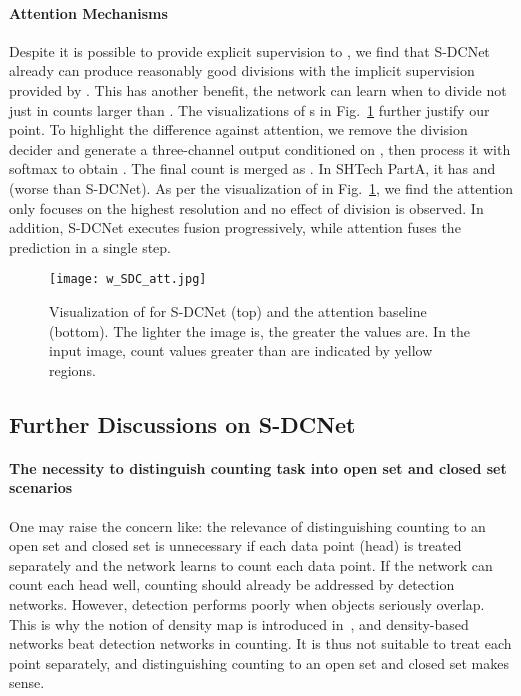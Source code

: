 \documentclass[10pt,twocolumn,letterpaper]{article}
\begin{document}
\paragraph{Attention Mechanisms}
Despite it is possible to provide explicit supervision to , we find that S-DCNet already can produce reasonably good divisions with the implicit supervision provided by . This has another benefit, the network can learn when to divide not just in counts larger than . The visualizations of s in Fig.~\ref{fig:w_visual} further justify our point. To highlight the difference against attention, we remove the division decider and generate a three-channel output conditioned on , then process it with softmax to obtain . The final count is merged as . In SHTech PartA, it has   and   (worse than S-DCNet). As per the visualization of  in Fig.~\ref{fig:w_visual}, we find the attention only focuses on the highest resolution and no effect of division is observed. In addition, S-DCNet executes fusion progressively, while attention fuses the prediction in a single step.

\begin{figure}[!ht]
	\begin{center}
\texttt{[image: w\_SDC\_att.jpg]}
	\end{center}
	\vspace{-15pt}
	\caption{Visualization of  for S-DCNet (top) and the attention baseline (bottom). The lighter the image is, the greater the values are. In the input image, count values greater than  are indicated by yellow regions.}
	\label{fig:w_visual}
	\vspace{-15pt}
\end{figure}


\subsection{Further Discussions on S-DCNet}
\paragraph{The necessity to distinguish counting task into open set and closed set scenarios}
One may raise the concern like: the relevance of distinguishing counting to an open set and closed set is unnecessary if each data point (head) is treated separately and the network learns to count each data point. If the network can count each head well, counting should already be addressed by detection networks. However, detection performs poorly when objects seriously overlap. This is why the notion of density map is introduced in~\cite{vlaz2010denlearn}, and density-based networks beat detection networks in counting. 
It is thus not suitable to treat each point separately, and distinguishing counting to an open set and closed set makes sense.
\end{document}
